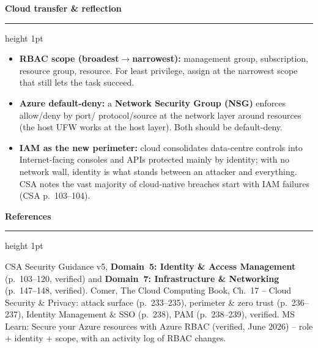 \documentclass[11pt]{article}
\newcommand{\wbsection}[1]{\par\vspace{11pt}\noindent
  {\large\bfseries\color{kred}#1}\par\vspace{2pt}
  {\color{kred!35}\hrule height 1pt}\par\vspace{6pt}}
\renewcommand{\emph}[1]{\textup{#1}}
\begin{document}
\wbsection{Cloud transfer \& reflection}
\begin{itemize}
\item \textbf{RBAC scope (broadest$\rightarrow$narrowest):} management group, subscription, resource
      group, resource. For least privilege, assign at the \emph{narrowest} scope that still lets the
      task succeed.
\item \textbf{Azure default-deny:} a \textbf{Network Security Group (NSG)} enforces allow/deny by port/
      protocol/source at the \emph{network} layer around resources (the host UFW works at the host
      layer). Both should be default-deny.
\item \textbf{IAM as the new perimeter:} cloud consolidates data-centre controls into Internet-facing
      consoles and APIs protected mainly by identity; with no network wall, identity is what stands
      between an attacker and everything. CSA notes the vast majority of cloud-native breaches start
      with IAM failures (CSA p.~103--104).
\end{itemize}

\wbsection{References}
CSA Security Guidance v5, \textbf{Domain~5: Identity \& Access Management} (p.~103--120, verified) and
\textbf{Domain~7: Infrastructure \& Networking} (p.~147--148, verified). Comer, \emph{The Cloud
Computing Book}, Ch.~17 -- Cloud Security \& Privacy: attack surface (p.~233--235), perimeter \& zero
trust (p.~236--237), Identity Management \& SSO (p.~238), PAM (p.~238--239), verified. MS Learn:
\emph{Secure your Azure resources with Azure RBAC} (verified, June 2026) -- role + identity + scope,
with an activity log of RBAC changes.
\end{document}
